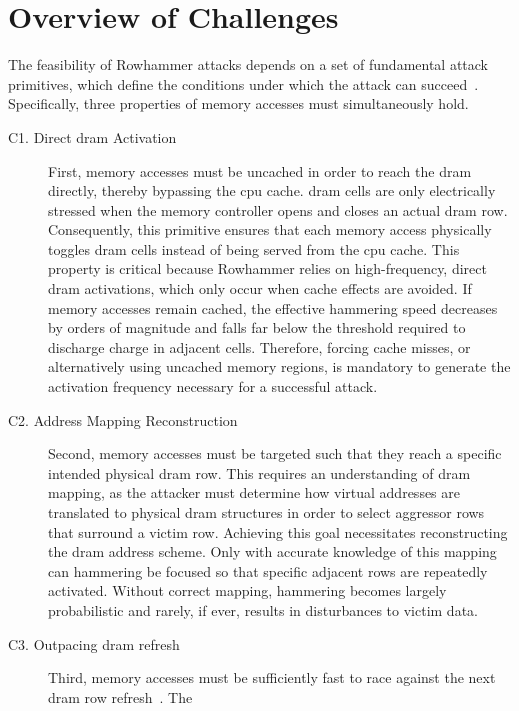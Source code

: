 \section{Overview of Challenges} \label{sec:overview-of-challenges}
  The feasibility of Rowhammer attacks depends on a set of fundamental attack primitives, which 
  define the conditions under which the attack can succeed~\cite{presRHAttacksWalkthrough, toolRowhammering}. Specifically, three 
  properties of memory accesses must simultaneously hold.

  \begin{description}
    \item[C1. Direct \gls{dram} Activation] \label{ch:uncached}
      First, memory accesses must be uncached in order to reach the \gls{dram} directly, thereby bypassing 
      the \gls{cpu} cache. \gls{dram} cells are only electrically stressed when the memory controller opens and 
      closes an actual \gls{dram} row. Consequently, this primitive ensures that each memory access physically 
      toggles \gls{dram} cells instead of being served from the \gls{cpu} cache. This property is critical because 
      Rowhammer relies on high-frequency, direct \gls{dram} activations, which only occur when cache effects 
      are avoided. If memory accesses remain cached, the effective hammering speed decreases by orders 
      of magnitude and falls far below the threshold required to discharge charge in adjacent cells. 
      Therefore, forcing cache misses, or alternatively using uncached memory regions, is mandatory 
      to generate the activation frequency necessary for a successful attack.
    \item[C2. Address Mapping Reconstruction] \label{ch:targeted}
      Second, memory accesses must be targeted such that they reach a specific intended physical \gls{dram} 
      row. This requires an understanding of \gls{dram} mapping, as the attacker must determine how virtual 
      addresses are translated to physical \gls{dram} structures in order to select aggressor rows that 
      surround a victim row. Achieving this goal necessitates reconstructing the \gls{dram} address scheme. 
      Only with accurate knowledge of this mapping can hammering be focused so that specific adjacent 
      rows are repeatedly activated. Without correct mapping, hammering becomes largely probabilistic 
      and rarely, if ever, results in disturbances to victim data.
    \item[C3. Outpacing \gls{dram} refresh] \label{ch:fast}
      Third, memory accesses must be sufficiently fast to race against the next \gls{dram} row refresh~\cite{toolRowhammering, webTenYearsOfRH}. The 

\end{description}
